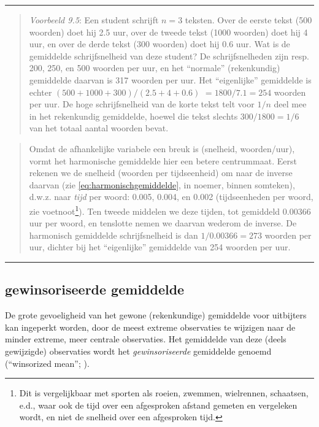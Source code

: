\documentclass[
]{book}
\begin{document}
\begin{center}\rule{0.5\linewidth}{0.5pt}\end{center}

\begin{quote}
\emph{Voorbeeld 9.5}:
Een student schrijft \(n=3\) teksten. Over de eerste tekst (500 woorden)
doet hij 2.5 uur, over de tweede tekst (1000 woorden) doet hij 4 uur, en
over de derde tekst (300 woorden) doet hij 0.6 uur. Wat is de gemiddelde
schrijfsnelheid van deze student? De schrijfsnelheden zijn resp. 200,
250, en 500 woorden per uur, en het ``normale'' (rekenkundig) gemiddelde
daarvan is 317 woorden per uur. Het ``eigenlijke'' gemiddelde is
echter \((500+1000+300)/(2.5+4+0.6)\) \(=1800/7.1=254\) woorden per uur. De hoge
schrijfsnelheid van de korte tekst telt voor \(1/n\) deel mee in het
rekenkundig gemiddelde, hoewel die tekst slechts \(300/1800=1/6\) van het
totaal aantal woorden bevat.
\end{quote}

\begin{quote}
Omdat de afhankelijke variabele een breuk is (snelheid, woorden/uur),
vormt het harmonische gemiddelde hier een betere centrummaat. Eerst
rekenen we de snelheid (woorden per tijdseenheid) om naar de inverse
daarvan (zie \eqref{eq:harmonischgemiddelde}, in noemer, binnen somteken),
d.w.z. naar \emph{tijd} per woord: 0.005, 0.004, en 0.002 (tijdseenheden per
woord, zie voetnoot\footnote{Dit is vergelijkbaar met sporten als roeien, zwemmen, wielrennen, schaatsen, e.d., waar ook de tijd over een afgesproken afstand gemeten en vergeleken wordt, en niet de snelheid over een afgesproken tijd.}). Ten tweede middelen we deze tijden, tot
gemiddeld 0.00366 uur per woord, en tenslotte nemen we daarvan wederom
de inverse. De harmonisch gemiddelde schrijfsnelheid is dan \(1/0.00366=273\)
woorden per uur, dichter bij het ``eigenlijke'' gemiddelde van 254 woorden
per uur.
\end{quote}

\begin{center}\rule{0.5\linewidth}{0.5pt}\end{center}

\hypertarget{gewinsoriseerde-gemiddelde}{%
\subsection{gewinsoriseerde gemiddelde}\label{gewinsoriseerde-gemiddelde}}

De grote gevoeligheid van het gewone (rekenkundige) gemiddelde voor
uitbijters kan ingeperkt worden, door de meest extreme observaties te
wijzigen naar de minder extreme, meer centrale observaties. Het
gemiddelde van deze (deels gewijzigde) observaties wordt het
\emph{gewinsoriseerde} gemiddelde genoemd (``winsorized mean''; ).
\end{document}
